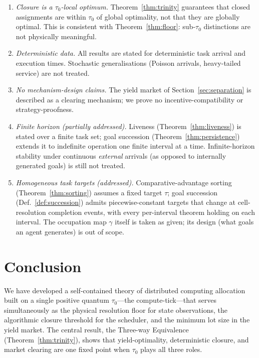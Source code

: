 \documentclass[11pt,twocolumn,a4paper]{article}
\theoremstyle{plain}
\theoremstyle{definition}
\theoremstyle{remark}
\newcommand{\tick}{\tau_0}
\begin{document}
\begin{enumerate}[nosep]
\item \emph{Closure is a $\tick$-local optimum.} Theorem~\ref{thm:trinity} guarantees that closed assignments are within $\tick$ of global optimality, not that they are globally optimal. This is consistent with Theorem~\ref{thm:floor}: sub-$\tick$ distinctions are not physically meaningful.
\item \emph{Deterministic data.} All results are stated for deterministic task arrival and execution times. Stochastic generalisations (Poisson arrivals, heavy-tailed service) are not treated.
\item \emph{No mechanism-design claims.} The yield market of Section~\ref{sec:separation} is described as a clearing mechanism; we prove no incentive-compatibility or strategy-proofness.
\item \emph{Finite horizon (partially addressed).} Liveness (Theorem~\ref{thm:liveness}) is stated over a finite task set; goal succession (Theorem~\ref{thm:persistence}) extends it to indefinite operation one finite interval at a time. Infinite-horizon stability under continuous \emph{external} arrivals (as opposed to internally generated goals) is still not treated.
\item \emph{Homogeneous task targets (addressed).} Comparative-advantage sorting (Theorem~\ref{thm:sorting}) assumes a fixed target $\tau$; goal succession (Def.~\ref{def:succession}) admits piecewise-constant targets that change at cell-resolution completion events, with every per-interval theorem holding on each interval. The occupation map $\gamma$ itself is taken as given; its design (what goals an agent generates) is out of scope.
\end{enumerate}

\section{Conclusion}
\label{sec:conclusion}

We have developed a self-contained theory of distributed computing allocation built on a single positive quantum $\tick$---the compute-tick---that serves simultaneously as the physical resolution floor for state observations, the algorithmic closure threshold for the scheduler, and the minimum lot size in the yield market. The central result, the Three-way Equivalence (Theorem~\ref{thm:trinity}), shows that yield-optimality, deterministic closure, and market clearing are one fixed point when $\tick$ plays all three roles.
\end{document}
